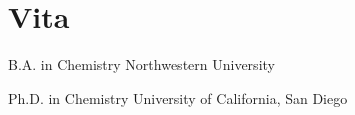
\begingroup
\chapter*{Vita}
\endgroup

\indent B.A. in Chemistry \hfill Northwestern University

\indent Ph.D. in Chemistry \hfill University of California, San Diego
